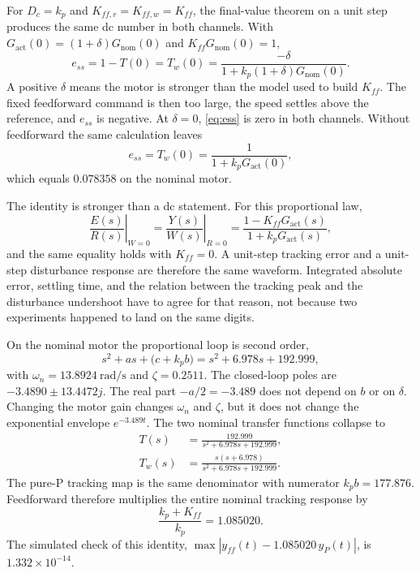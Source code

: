 \documentclass[12pt,a4paper]{article}
\begin{document}
For \(D_c=k_p\) and \(K_{ff,r}=K_{ff,w}=K_{ff}\), the final-value theorem on a unit step produces the same dc number in both channels. With \(G_{\mathrm{act}}(0)=(1+\delta)G_{\mathrm{nom}}(0)\) and \(K_{ff}G_{\mathrm{nom}}(0)=1\),
\begin{equation}
  e_{ss}
  =1-T(0)
  =T_w(0)
  =\frac{-\delta}{1+k_p(1+\delta)G_{\mathrm{nom}}(0)}.
  \label{eq:ess}
\end{equation}
A positive \(\delta\) means the motor is stronger than the model used to build \(K_{ff}\). The fixed feedforward command is then too large, the speed settles above the reference, and \(e_{ss}\) is negative.
At \(\delta=0\), \eqref{eq:ess} is zero in both channels.
Without feedforward the same calculation leaves
\begin{equation}
  e_{ss}=T_w(0)=\frac{1}{1+k_p G_{\mathrm{act}}(0)},
  \label{eq:ess-p}
\end{equation}
which equals \(0.078358\) on the nominal motor.

The identity is stronger than a dc statement. For this proportional law,
\begin{equation}
  \left.\frac{E(s)}{R(s)}\right|_{W=0}
  =\left.\frac{Y(s)}{W(s)}\right|_{R=0}
  =\frac{1-K_{ff}G_{\mathrm{act}}(s)}{1+k_p G_{\mathrm{act}}(s)},
  \label{eq:identity}
\end{equation}
and the same equality holds with \(K_{ff}=0\).
A unit-step tracking error and a unit-step disturbance response are therefore the same waveform.
Integrated absolute error, settling time, and the relation between the tracking peak and the disturbance undershoot have to agree for that reason, not because two experiments happened to land on the same digits.

On the nominal motor the proportional loop is second order,
\begin{equation}
  s^2+as+\bigl(c+k_p b\bigr)
  =s^2+6.978s+192.999,
  \label{eq:charP}
\end{equation}
with \(\omega_n=13.8924~\mathrm{rad/s}\) and \(\zeta=0.2511\).
The closed-loop poles are \(-3.4890\pm 13.4472j\).
The real part \(-a/2=-3.489\) does not depend on \(b\) or on \(\delta\).
Changing the motor gain changes \(\omega_n\) and \(\zeta\), but it does not change the exponential envelope \(e^{-3.489t}\).
The two nominal transfer functions collapse to
\begin{align}
  T(s)&=\frac{192.999}{s^2+6.978s+192.999},
  \label{eq:Tnom}\\
  T_w(s)&=\frac{s(s+6.978)}{s^2+6.978s+192.999}.
  \label{eq:Twnom}
\end{align}
The pure-P tracking map is the same denominator with numerator \(k_p b=177.876\).
Feedforward therefore multiplies the entire nominal tracking response by
\begin{equation}
  \frac{k_p+K_{ff}}{k_p}=1.085020.
  \label{eq:scale}
\end{equation}
The simulated check of this identity, \(\max|y_{ff}(t)-1.085020\,y_P(t)|\), is \(1.332\times 10^{-14}\).
\end{document}

